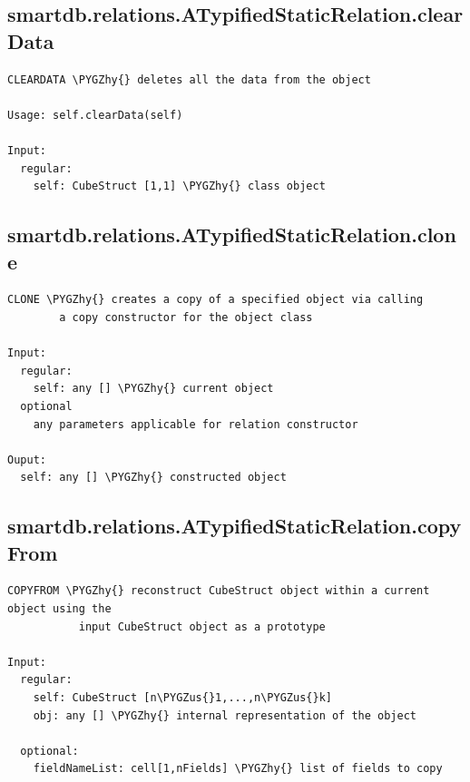 \documentclass[letterpaper,10pt,english]{sphinxmanual}
\def\PYGZus{\char`\_}
\def\PYGZhy{\char`\-}
\begin{document}
\subsection{smartdb.relations.ATypifiedStaticRelation.clearData}
\label{chap_functions:smartdb-relations-atypifiedstaticrelation-cleardata}
\begin{Verbatim}[commandchars=\\\{\}]
CLEARDATA \PYGZhy{} deletes all the data from the object

Usage: self.clearData(self)

Input:
  regular:
    self: CubeStruct [1,1] \PYGZhy{} class object
\end{Verbatim}


\subsection{smartdb.relations.ATypifiedStaticRelation.clone}
\label{chap_functions:smartdb-relations-atypifiedstaticrelation-clone}
\begin{Verbatim}[commandchars=\\\{\}]
CLONE \PYGZhy{} creates a copy of a specified object via calling
        a copy constructor for the object class

Input:
  regular:
    self: any [] \PYGZhy{} current object
  optional
    any parameters applicable for relation constructor

Ouput:
  self: any [] \PYGZhy{} constructed object
\end{Verbatim}


\subsection{smartdb.relations.ATypifiedStaticRelation.copyFrom}
\label{chap_functions:smartdb-relations-atypifiedstaticrelation-copyfrom}
\begin{Verbatim}[commandchars=\\\{\}]
COPYFROM \PYGZhy{} reconstruct CubeStruct object within a current object using the
           input CubeStruct object as a prototype

Input:
  regular:
    self: CubeStruct [n\PYGZus{}1,...,n\PYGZus{}k]
    obj: any [] \PYGZhy{} internal representation of the object

  optional:
    fieldNameList: cell[1,nFields] \PYGZhy{} list of fields to copy
\end{Verbatim}
\end{document}
